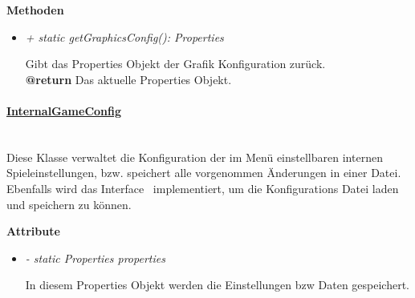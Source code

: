             \textbf{Methoden}					
            \begin{itemize}
                \item \textit{+ {static} getGraphicsConfig(): Properties}
                    \begin{leftbar}[0.9\linewidth]
                        Gibt das Properties Objekt der Grafik Konfiguration zurück.\\
                        \textbf{@return} Das aktuelle Properties Objekt.
                    \end{leftbar}
            \end{itemize}
		
		\paragraph{\underline{InternalGameConfig}} \mbox{}\\
            Diese Klasse verwaltet die Konfiguration der im Menü einstellbaren 
            internen Spieleinstellungen, bzw. speichert alle vorgenommen Änderungen
            in einer Datei. 
            Ebenfalls wird das Interface~ implementiert, um die Konfigurations Datei
            laden und speichern zu können. \par    
                    
            \textbf{Attribute}
            \begin{itemize}
                \item \textit{- {static} Properties properties}
                    \begin{leftbar}[0.9\linewidth]
                        In diesem Properties Objekt werden die Einstellungen bzw Daten 
                        gespeichert.
                    \end{leftbar}
            \end{itemize}

    \pagebreak